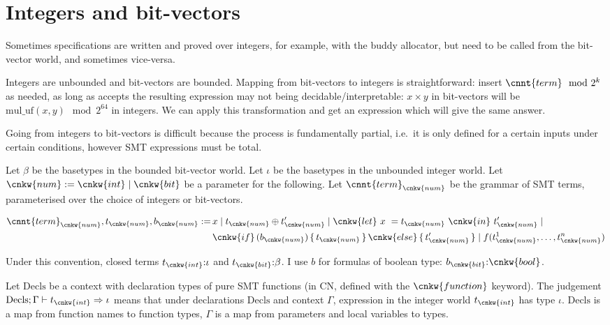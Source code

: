 \section{Integers and bit-vectors}

Sometimes specifications are written and proved over integers, for example,
with the buddy allocator, but need to be called from the bit-vector world, and
sometimes vice-versa.

Integers are unbounded and bit-vectors are bounded. Mapping from bit-vectors to
integers is straightforward: insert $\cnnt{term} \mod 2^k$ as needed, as long
as accepts the resulting expression may not being decidable/interpretable: $x
\times y$ in bit-vectors will be $\mathrm{mul\_uf}(x,y) \mod 2^{64}$ in
integers. We can apply this transformation and get an expression which will
give the same answer.

Going from integers to bit-vectors is difficult because the process is
fundamentally partial, i.e.\ it is only defined for a certain inputs under
certain conditions, however SMT expressions must be total.

Let $\beta$ be the basetypes in the bounded bit-vector world. Let $\iota$ be
the basetypes in the unbounded integer world. Let $\cnkw{num} \mathrel{{:}{=}}
\cnkw{int} \mid \cnkw{bit}$ be a parameter for the following. Let
$\cnnt{term}_{\cnkw{num}}$ be the grammar of SMT terms, parameterised over the
choice of integers or bit-vectors.

{\small%
\begin{align*}
\cnnt{term}_{\cnkw{num}}, t_{\cnkw{num}}, b_{\cnkw{num}} \mathrel{{:}{=}}
\, & x \mid t_{\cnkw{num}} \oplus t'_{\cnkw{num}} \mid
\cnkw{let}\ x\ = t_{\cnkw{num}}\ \cnkw{in}\ t'_{\cnkw{num}} \mid \\
& \cnkw{if} \, (b_{\cnkw{num}}) \,\{\, t_{\cnkw{num}} \,\}\, \cnkw{else} \,\{\, t'_{\cnkw{num}} \,\} \mid
f(t^1_{\cnkw{num}}, \ldots, t^n_{\cnkw{num}})
\end{align*}}

Under this convention, closed terms $t_{\cnkw{int}} {:} \iota$ and
$t_{\cnkw{bit}} {:} \beta$. I use $b$ for formulas of boolean type:
$b_{\cnkw{bit}} {:} \cnkw{bool}$.

Let $\mathrm{Decls}$ be a context with declaration types of pure SMT functions
(in CN, defined with the $\cnkw{function}$ keyword). The judgement
$\mathrm{Decls} ; \Gamma \vdash t_{\cnkw{int}} \Rightarrow \iota$  means that
under declarations $\mathrm{Decls}$ and context $\Gamma$, expression in the
integer world $t_{\cnkw{int}}$ has type $\iota$. $\mathrm{Decls}$ is a map from
function names to function types, $\Gamma$ is a map from parameters and local
variables to types.

